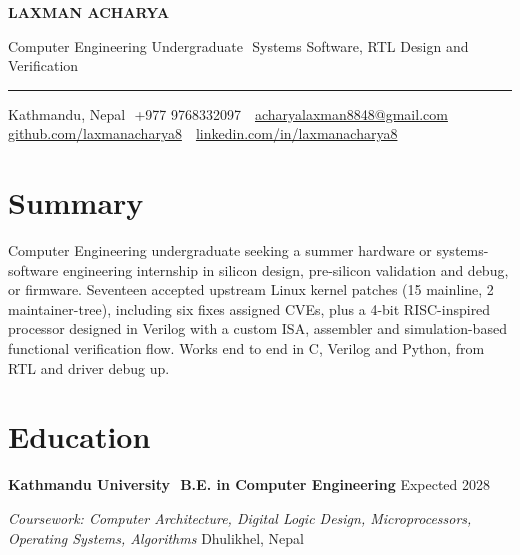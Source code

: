 \documentclass[10pt,letterpaper]{article}
\newcommand{\entry}[2]{%
  \needspace{3\baselineskip}\vspace{2.1pt}%
  {\bfseries\fontsize{10.1}{11.8}\selectfont #1}\hfill
  {\fontsize{9.1}{11}\selectfont\color{slate}#2}\par\vspace{0.4pt}}
\newcommand{\subentry}[2]{%
  {\fontsize{9.4}{11}\selectfont\itshape\color{deepnavy}#1}\hfill
  {\fontsize{9.1}{11}\selectfont\color{slate}#2}\par\vspace{0.8pt}}
\newcommand{\divider}{\textcolor{accentblue}{\,\textbar\,}}
\begin{document}
\fontsize{9.0}{9.95}\selectfont

{\color{deepnavy}\bfseries\fontsize{22}{25}\selectfont LAXMAN ACHARYA}

\vspace{3pt}
{\fontsize{9.6}{12}\selectfont\color{slate}%
Computer Engineering Undergraduate \divider Systems Software, RTL Design and Verification}

\vspace{3.5pt}
{\color{accentblue}\rule{\textwidth}{1.3pt}}
\vspace{4pt}

{\fontsize{8.75}{12}\selectfont%
Kathmandu, Nepal \divider +977 9768332097 \divider
\href{mailto:acharyalaxman8848@gmail.com}{acharyalaxman8848@gmail.com} \divider
\href{https://github.com/laxmanacharya8}{github.com/laxmanacharya8} \divider
\href{https://www.linkedin.com/in/laxmanacharya8}{linkedin.com/in/laxmanacharya8}}

\section{Summary}
Computer Engineering undergraduate seeking a summer hardware or systems-software engineering
internship in silicon design, pre-silicon validation and debug, or firmware. Seventeen accepted upstream
Linux kernel patches (15 mainline, 2 maintainer-tree), including six fixes assigned CVEs, plus a
4-bit RISC-inspired processor designed in Verilog with a custom ISA, assembler and simulation-based
functional verification flow. Works end to end in C, Verilog and Python, from RTL and driver debug up.

\section{Education}
\entry{Kathmandu University \divider B.E. in Computer Engineering}{Expected 2028}
\subentry{Coursework: Computer Architecture, Digital Logic Design, Microprocessors, Operating Systems, Algorithms}{Dhulikhel, Nepal}
\end{document}
